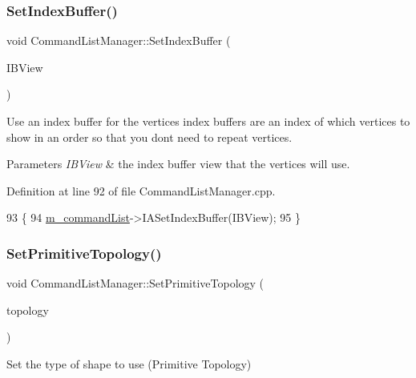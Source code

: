 \subsubsection{\texorpdfstring{Set\+Index\+Buffer()}{SetIndexBuffer()}}
{\footnotesize\ttfamily void Command\+List\+Manager\+::\+Set\+Index\+Buffer (\begin{DoxyParamCaption}\item[{const D3\+D12\+\_\+\+I\+N\+D\+E\+X\+\_\+\+B\+U\+F\+F\+E\+R\+\_\+\+V\+I\+EW $\ast$}]{I\+B\+View }\end{DoxyParamCaption})}



Use an index buffer for the vertices index buffers are an index of which vertices to show in an order so that you don\textquotesingle{}t need to repeat vertices. 


\begin{DoxyParams}{Parameters}
{\em I\+B\+View} & the index buffer view that the vertices will use. \\
\hline
\end{DoxyParams}


Definition at line 92 of file Command\+List\+Manager.\+cpp.


\begin{DoxyCode}
93 \{
94     \mbox{\hyperlink{class_command_list_manager_a1366f0acddca408167ffcab59be71ddb}{m\_commandList}}->IASetIndexBuffer(IBView);
95 \}
\end{DoxyCode}
\mbox{\label{class_command_list_manager_a6d15e9c6953e147362f93ce8f8a96278}} 
\subsubsection{\texorpdfstring{Set\+Primitive\+Topology()}{SetPrimitiveTopology()}}
{\footnotesize\ttfamily void Command\+List\+Manager\+::\+Set\+Primitive\+Topology (\begin{DoxyParamCaption}\item[{enum D3\+D\+\_\+\+P\+R\+I\+M\+I\+T\+I\+V\+E\+\_\+\+T\+O\+P\+O\+L\+O\+GY}]{topology }\end{DoxyParamCaption})}



Set the type of shape to use (Primitive Topology) 



